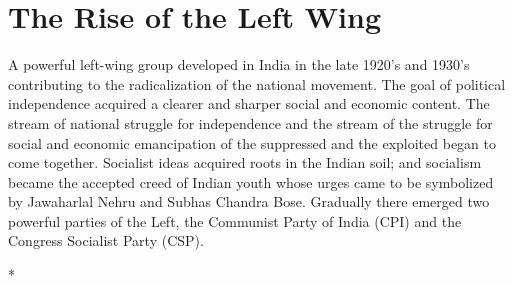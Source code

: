 \chapter{The Rise of the Left Wing}
\begin{multicols}{2}

A powerful left-wing group developed in India in the late 1920's and 1930's contributing to the radicalization of the national movement. The goal of political independence acquired a clearer and sharper social and economic content. The stream of national struggle for independence and the stream of the struggle for social and economic emancipation of the suppressed and the exploited began to come together. Socialist ideas acquired roots in the Indian soil; and socialism became the accepted creed of Indian youth whose urges came to be symbolized by Jawaharlal Nehru and Subhas Chandra Bose. Gradually there emerged two powerful parties of the Left, the Communist Party of India (CPI) and the Congress Socialist Party (CSP).

\begin{center}*\end{center}

\paragraph*{}


\end{multicols}
